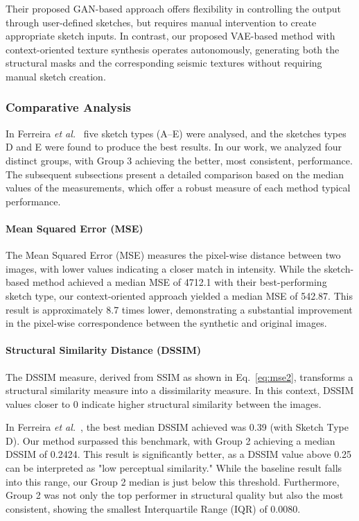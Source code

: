 \documentclass{ieeeaccess}
\begin{document}
Their proposed GAN-based approach offers flexibility in controlling the output through user-defined sketches, but requires manual intervention to create appropriate sketch inputs. In contrast, our proposed VAE-based method with context-oriented texture synthesis operates autonomously, generating both the structural masks and the corresponding seismic textures without requiring manual sketch creation.


\subsubsection{Comparative Analysis}

In Ferreira \emph{et al.}~\cite{Ferreira2020} five sketch types (A--E) were analysed, and the sketches types D and E were found to produce the best results. In our work, we analyzed four distinct groups, with Group 3 achieving the better, most consistent, performance. The subsequent subsections present a detailed comparison based on the median values of the measurements, which offer a robust measure of each method typical performance.

\paragraph{Mean Squared Error (MSE)}

The Mean Squared Error (MSE) measures the pixel-wise distance between two images, with lower values indicating a closer match in intensity. While the sketch-based method achieved a median MSE of 4712.1 with their best-performing sketch type, our context-oriented approach yielded a median MSE of 542.87. This result is approximately 8.7 times lower, demonstrating a substantial improvement in the pixel-wise correspondence between the synthetic and original images.

\paragraph{Structural Similarity Distance (DSSIM)}

The DSSIM measure, derived from SSIM as shown in Eq.~\ref{eq:mse2}, transforms a structural similarity measure into a dissimilarity measure. In this context, DSSIM values closer to 0 indicate higher structural similarity between the images.

In Ferreira \emph{et al.}~\cite{Ferreira2020}, the best median DSSIM achieved was 0.39 (with Sketch Type D). Our method surpassed this benchmark, with Group 2 achieving a median DSSIM of 0.2424. This result is significantly better, as a DSSIM value above 0.25 can be interpreted as "low perceptual similarity." While the baseline result falls into this range, our Group 2 median is just below this threshold. Furthermore, Group 2 was not only the top performer in structural quality but also the most consistent, showing the smallest Interquartile Range (IQR) of 0.0080.
\end{document}
